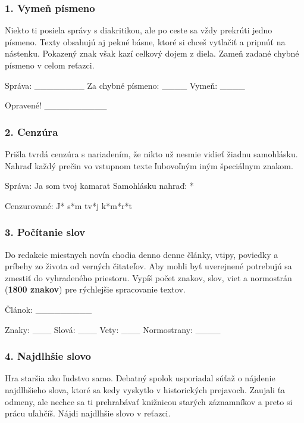 \subsubsection*{1. Vymeň písmeno}
Niekto ti posiela správy s diakritikou, ale po ceste sa vždy prekrúti jedno písmeno. Texty obsahujú aj pekné básne, ktoré si chceš vytlačiť a pripnúť na nástenku. Pokazený znak však kazí celkový dojem z diela. Zameň zadané chybné písmeno v celom reťazci.

\begin{code}
Správa: ________
Za chybné písmeno: ____
Vymeň: ____

Opravené!
__________
\end{code}


\subsubsection*{2. Cenzúra}
Prišla tvrdá cenzúra s nariadením, že nikto už nesmie vidieť žiadnu samohlásku. Nahraď každý prečin vo vstupnom texte ľubovoľným iným špeciálnym znakom.

\begin{code}
Správa: Ja som tvoj kamarat
Samohlásku nahraď: *

Cenzurované: J* s*m tv*j k*m*r*t
\end{code}


\subsubsection*{3. Počítanie slov}
Do redakcie miestnych novín chodia denno denne články, vtipy, poviedky a príbehy zo života od verných čitateľov. Aby mohli byť uverejnené potrebujú sa zmestiť do vyhradeného priestoru. Vypíš počet znakov, slov, viet a normostrán (\textbf{1800 znakov}) pre rýchlejšie spracovanie textov.

\begin{code}
Článok: _________

Znaky: ___
Slová: ___
Vety: ___
Normostrany: ____
\end{code}


\subsubsection*{4. Najdlhšie slovo}
Hra staršia ako ľudstvo samo. Debatný spolok usporiadal súťaž o nájdenie najdlhšieho slova, ktoré sa kedy vyskytlo v historických prejavoch. Zaujali ťa odmeny, ale nechce sa ti prehrabávať knižnicou starých záznamníkov a preto si prácu uľahčíš. Nájdi najdlhšie slovo v reťazci.

